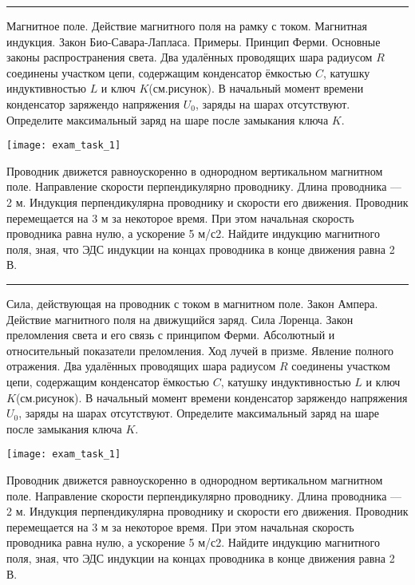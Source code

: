 \documentclass[a5paper, landscape]{exam}
\begin{document}
\rule{1\textwidth}{0.4pt}
	\begin{questions}
	\question Магнитное поле. Действие магнитного поля на рамку с током. Магнитная индукция. Закон Био-Савара-Лапласа. Примеры.
	\question Принцип Ферми. Основные законы распространения света.
	\question Два удалённых проводящих шара радиусом $R$ соединены участком цепи, содержащим конденсатор ёмкостью $C$, катушку индуктивностью $L$ и ключ $K$(см.рисунок). В начальный момент времени конденсатор заряжендо напряжения $U_0$, заряды на шарах отсутствуют. Определите максимальный заряд на шаре после замыкания ключа $K$.
	
	\texttt{[image: exam\_task\_1]}


	\question Проводник движется равноускоренно в однородном вертикальном магнитном поле. Направление скорости перпендикулярно проводнику. Длина проводника — 2 м. Индукция перпендикулярна проводнику и скорости его движения. Проводник перемещается на 3 м за некоторое время. При этом начальная скорость проводника равна нулю, а ускорение 5 м/с2. Найдите индукцию магнитного поля, зная, что ЭДС индукции на концах проводника в конце движения равна 2 В.
\end{questions}


\newpage
\rule{1\textwidth}{0.4pt}
\begin{questions}
\question Сила, действующая на проводник с током в магнитном поле. Закон Ампера. Действие магнитного поля на движущийся заряд. Сила Лоренца.
\question Закон преломления света и его связь с принципом Ферми. Абсолютный и относительный показатели преломления. Ход лучей в призме. Явление полного отражения.
\question Два удалённых проводящих шара радиусом $R$ соединены участком цепи, содержащим конденсатор ёмкостью $C$, катушку индуктивностью $L$ и ключ $K$(см.рисунок). В начальный момент времени конденсатор заряжендо напряжения $U_0$, заряды на шарах отсутствуют. Определите максимальный заряд на шаре после замыкания ключа $K$.

\texttt{[image: exam\_task\_1]}


\question Проводник движется равноускоренно в однородном вертикальном магнитном поле. Направление скорости перпендикулярно проводнику. Длина проводника — 2 м. Индукция перпендикулярна проводнику и скорости его движения. Проводник перемещается на 3 м за некоторое время. При этом начальная скорость проводника равна нулю, а ускорение 5 м/с2. Найдите индукцию магнитного поля, зная, что ЭДС индукции на концах проводника в конце движения равна 2 В.
\end{questions}
\end{document}
